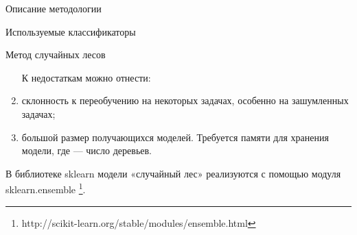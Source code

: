 \begin{section}{Описание методологии}
\begin{subsection}{Используемые классификаторы}
\begin{subsubsection}{Метод случайных лесов}
\begin{enumerate}
  К недостаткам можно отнести:
  \item	склонность к переобучению на некоторых задачах, особенно на зашумленных задачах;
  \item	большой размер получающихся моделей. Требуется  памяти для хранения модели, где  — число деревьев.
\end{enumerate}

В библиотеке sklearn модели «случайный лес»  реализуются с помощью модуля sklearn.ensemble \footnote{http://scikit-learn.org/stable/modules/ensemble.html}.
    \end{subsubsection}

  \end{subsection}

\end{section}
